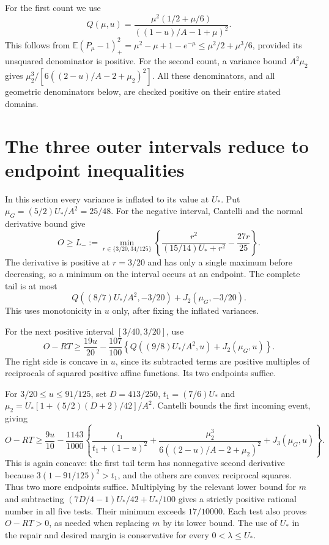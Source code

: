 \documentclass[11pt]{article}
\newcommand{\E}{\mathbb E}\newcommand{\Pp}{\mathbb P}
\begin{document}
For the first count we use
\[
 Q(\mu,u)=\frac{\mu^2(1/2+\mu/6)}{((1-u)/A-1+\mu)^2}.
\]
This follows from $\E(P_\mu-1)_+^2=\mu^2-\mu+1-e^{-\mu}
\le\mu^2/2+\mu^3/6$, provided its unsquared denominator is positive.
For the second count, a variance bound $A^2\mu_2$ gives
$\mu_2^3/[6((2-u)/A-2+\mu_2)^2]$.
All these denominators, and all geometric denominators below, are
checked positive on their entire stated domains.

\section{The three outer intervals reduce to endpoint inequalities}
In this section every variance is inflated to its value at $U_*$.
Put $\mu_G=(5/2)U_*/A^2=25/48$. For the negative interval,
Cantelli and the normal derivative bound give
\[
 O\ge L_-:=\min_{r\in\{3/20,34/125\}}
 \left\{\frac{r^2}{(15/14)U_*+r^2}-\frac{27r}{25}\right\}.
\]
The derivative is positive at $r=3/20$ and has only a single maximum
before decreasing, so a minimum on the interval occurs at an endpoint.
The complete tail is at most
\[Q((8/7)U_*/A^2,-3/20)+J_2(\mu_G,-3/20).\]
This uses monotonicity in $u$ only, after fixing the inflated variances.

For the next positive interval $[3/40,3/20]$, use
\[
 O-RT\ge\frac{19u}{20}-\frac{107}{100}
 \left\{Q((9/8)U_*/A^2,u)+J_2(\mu_G,u)\right\}.
\]
The right side is concave in $u$, since its subtracted terms are
positive multiples of reciprocals of squared positive affine functions.
Its two endpoints suffice.

For $3/20\le u\le91/125$, set $D=413/250$,
$t_1=(7/6)U_*$ and $\mu_2=U_*[1+(5/2)(D+2)/42]/A^2$.
Cantelli bounds the first incoming event, giving
\[
 O-RT\ge\frac{9u}{10}-\frac{1143}{1000}
 \left\{\frac{t_1}{t_1+(1-u)^2}
 +\frac{\mu_2^3}{6((2-u)/A-2+\mu_2)^2}+J_3(\mu_G,u)\right\}.
\]
This is again concave: the first tail term has nonnegative second
derivative because $3(1-91/125)^2>t_1$, and the others are convex
reciprocal squares. Thus two more endpoints suffice.
Multiplying by the relevant lower bound for $m$ and subtracting
$(7D/4-1)U_*/42+U_*/100$ gives a strictly positive rational number
in all five tests. Their minimum exceeds $17/10000$.
Each test also proves $O-RT>0$, as needed when replacing $m$ by
its lower bound. The use of $U_*$ in the repair and desired margin
is conservative for every $0<\lambda\le U_*$.
\end{document}
